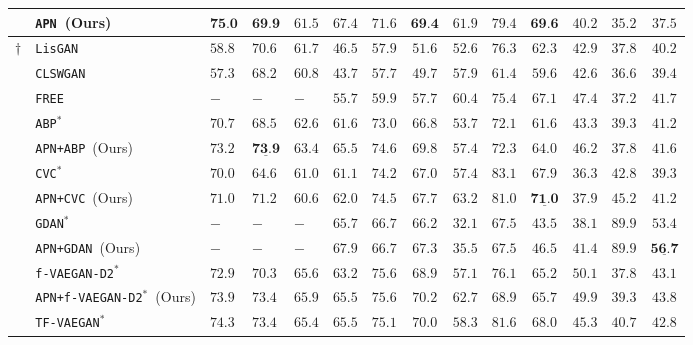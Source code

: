 \begin{table*}[t]
{\begin{tabular}{ll| x{1.2cm} x{1.2cm} x{1.2cm} |c c c |c c c |c c c}
      &\texttt{APN}~(Ours) &  $\textbf{75.0}$ & $\textbf{69.9}$ & $61.5$&  $67.4$ & $71.6$ & $\textbf{69.4}$&  $61.9$ & $79.4$ & $\textbf{69.6}$&  $40.2$ & $35.2$ & $37.5$\\
     \hline
&\texttt{LisGAN}~\citep{li2019leveraging}  &  $58.8$ & $70.6$ & $61.7$&  $46.5$ & $57.9$ & $51.6$&  $52.6$ & $76.3$ & $62.3$&  $42.9$ & $37.8$ & $40.2$ \\
    &\texttt{CLSWGAN}~\citep{CLSWGAN} &  $57.3$ & $68.2$ & $60.8$&  $43.7$ & $57.7$ & $49.7$&  $57.9$ & $61.4$ & $59.6$&  $42.6$ & $36.6$ & $39.4$ \\
    &\texttt{FREE}~\citep{free2021} &  $-$ & $-$ & $-$ &  $55.7$ & $59.9$ & $57.7$&  $60.4$ & $75.4$ & $67.1$&  $47.4$ & $37.2$ & $41.7$ \\
      & \texttt{ABP$^*$}~\citep{ABP} &  $70.7$ & $68.5$ & $62.6$&  $61.6$ & $73.0$ & $66.8$&  $53.7$ & $72.1$ & $61.6$&  $43.3$ & $39.3$ & $41.2$\\
&\texttt{APN+ABP}~(Ours) &  $73.2$ & $\underline{\textbf{73.9}}$ & $63.4$&  $65.5$ & $74.6$ & $ 69.8$&  $57.4$ & $72.3$ & $64.0$&  $46.2$ & $37.8$ & $41.6$\\
     & \texttt{CVC$^*$}~\citep{CVC} &  $70.0$ & $64.6$ & $61.0$&  $61.1$ & $74.2$ & $67.0$&  $57.4$ & $83.1$ & $67.9$&  $36.3$ & $42.8$ & $39.3$ \\
      &\texttt{APN+CVC}~(Ours) &  $71.0$ & $71.2$ & $60.6$&  $62.0$ & $74.5$ & $67.7$&  $63.2$ & $81.0$ & $\underline{\textbf{71.0}}$&  $37.9$ & $45.2$ & $41.2$ \\
     & \texttt{GDAN$^*$}~\citep{GDAN} &  $-$ & $-$ & $-$&  $65.7$ & $66.7$ & $ 66.2$&  $32.1$ & $67.5$ & $43.5$&  $38.1$ & $89.9$ & $53.4$ \\
      &\texttt{APN+GDAN}~(Ours) &  $-$ & $-$ & $-$&  $67.9$ & $66.7$ & $67.3$&  $35.5$ & $67.5$ & $46.5$&  $41.4$ & $89.9$ & $\underline{\textbf{56.7}}$ \\
     & \texttt{f-VAEGAN-D2$^*$}~\citep{xian2019} &  $72.9$ & $70.3$ & $65.6$&  $63.2$ & $75.6$ & $68.9$&  $57.1$ & $76.1$ & $65.2$&  $50.1$ & $37.8$ & $43.1$ \\
      &\texttt{APN+f-VAEGAN-D2$^*$}~(Ours) & $73.9$ & $73.4$ & $65.9$&  $65.5$ & $75.6$ &$70.2$ &  $62.7$ & $68.9$ &$65.7$&  $49.9$ & $39.3$ & $43.8$\\
    & \texttt{TF-VAEGAN$^*$}~\citep{tfvaegan} &  $74.3$ & $73.4$ & $65.4$&  $65.5$ & $75.1$ & $70.0$&  $58.3$ & $81.6$ & $68.0$&  $45.3$ & $40.7$ & $42.8$ \\

\end{tabular}}
\end{table*}
